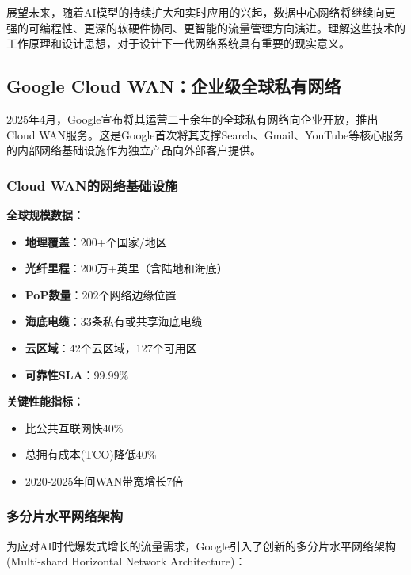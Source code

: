 展望未来，随着AI模型的持续扩大和实时应用的兴起，数据中心网络将继续向更强的可编程性、更深的软硬件协同、更智能的流量管理方向演进。理解这些技术的工作原理和设计思想，对于设计下一代网络系统具有重要的现实意义。
\subsection{Google Cloud WAN：企业级全球私有网络}

2025年4月，Google宣布将其运营二十余年的全球私有网络向企业开放，推出Cloud WAN服务。这是Google首次将其支撑Search、Gmail、YouTube等核心服务的内部网络基础设施作为独立产品向外部客户提供。

\subsubsection{Cloud WAN的网络基础设施}

\textbf{全球规模数据：}
\begin{itemize}
    \item \textbf{地理覆盖}：200+个国家/地区
    \item \textbf{光纤里程}：200万+英里（含陆地和海底）
    \item \textbf{PoP数量}：202个网络边缘位置
    \item \textbf{海底电缆}：33条私有或共享海底电缆
    \item \textbf{云区域}：42个云区域，127个可用区
    \item \textbf{可靠性SLA}：99.99\%
\end{itemize}

\textbf{关键性能指标：}
\begin{itemize}
    \item 比公共互联网快40\%
    \item 总拥有成本(TCO)降低40\%
    \item 2020-2025年间WAN带宽增长7倍
\end{itemize}

\subsubsection{多分片水平网络架构}

为应对AI时代爆发式增长的流量需求，Google引入了创新的多分片水平网络架构(Multi-shard Horizontal Network Architecture)：

